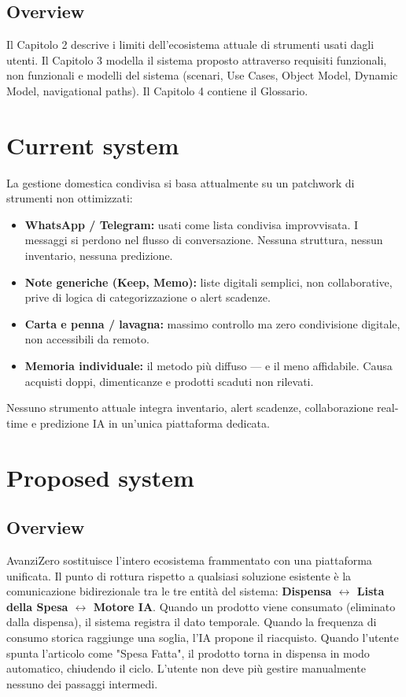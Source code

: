 \documentclass[12pt,a4paper]{article}
\begin{document}
\subsection{Overview}
Il Capitolo 2 descrive i limiti dell'ecosistema attuale di strumenti usati dagli utenti. Il Capitolo 3 modella il sistema proposto attraverso requisiti funzionali, non funzionali e modelli del sistema (scenari, Use Cases, Object Model, Dynamic Model, navigational paths). Il Capitolo 4 contiene il Glossario.

\section{Current system}
La gestione domestica condivisa si basa attualmente su un patchwork di strumenti non ottimizzati:
\begin{itemize}
    \item \textbf{WhatsApp / Telegram:} usati come lista condivisa improvvisata. I messaggi si perdono nel flusso di conversazione. Nessuna struttura, nessun inventario, nessuna predizione.
    \item \textbf{Note generiche (Keep, Memo):} liste digitali semplici, non collaborative, prive di logica di categorizzazione o alert scadenze.
    \item \textbf{Carta e penna / lavagna:} massimo controllo ma zero condivisione digitale, non accessibili da remoto.
    \item \textbf{Memoria individuale:} il metodo più diffuso — e il meno affidabile. Causa acquisti doppi, dimenticanze e prodotti scaduti non rilevati.
\end{itemize}
Nessuno strumento attuale integra inventario, alert scadenze, collaborazione real-time e predizione IA in un'unica piattaforma dedicata.

\section{Proposed system}

\subsection{Overview}
AvanziZero sostituisce l'intero ecosistema frammentato con una piattaforma unificata. Il punto di rottura rispetto a qualsiasi soluzione esistente è la comunicazione bidirezionale tra le tre entità del sistema: \textbf{Dispensa $\leftrightarrow$ Lista della Spesa $\leftrightarrow$ Motore IA}. Quando un prodotto viene consumato (eliminato dalla dispensa), il sistema registra il dato temporale. Quando la frequenza di consumo storica raggiunge una soglia, l'IA propone il riacquisto. Quando l'utente spunta l'articolo come "Spesa Fatta", il prodotto torna in dispensa in modo automatico, chiudendo il ciclo. L'utente non deve più gestire manualmente nessuno dei passaggi intermedi.
\end{document}
